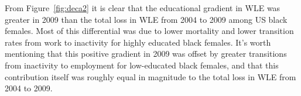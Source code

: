 \documentclass{article}
\begin{document}
From Figure~\ref{fig:deca2} it is clear that the educational gradient in WLE was
greater in 2009 than the total loss in WLE from 2004 to 2009 among US black
females. Most of this differential was due to lower mortality and lower
transition rates from work to inactivity for highly educated black females. It's
worth mentioning that this positive gradient in 2009 was offset by greater
transitions from inactivity to employment for low-educated black females, and
that this contribution itself was roughly equal in magnitude to the total loss
in WLE from 2004 to 2009.


\FloatBarrier

\singlespacing

   
\end{document}
